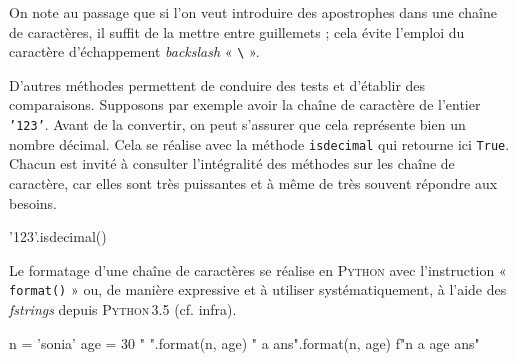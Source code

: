On note au passage que si l'on veut introduire des apostrophes dans une chaîne de caractères, il suffit de la mettre entre guillemets ; cela évite l'emploi du caractère d'échappement \textit{backslash} « \texttt{\textbackslash} ».

D'autres méthodes permettent de conduire des tests et d'établir des comparaisons. Supposons par exemple avoir la chaîne de caractère de l'entier \texttt{'123'}. Avant de la convertir, on peut s'assurer que cela représente bien un nombre décimal. Cela se réalise avec la méthode \texttt{isdecimal} qui retourne ici \texttt{True}. Chacun est invité à consulter l'intégralité des méthodes sur les chaîne de caractère, car elles sont très puissantes et à même de très souvent répondre aux besoins.

\begin{idleconsole}
	\begin{pyconsole}
		'123'.isdecimal()
	\end{pyconsole}
\end{idleconsole}

Le formatage d'une chaîne de caractères se réalise en \textsc{Python} avec l'instruction « \texttt{format()} » ou, de manière expressive et à utiliser systématiquement, à l'aide des \textit{fstrings} depuis \textsc{Python\,3.5} (cf. infra). 

\begin{idleconsole}
	\begin{pyconsole}
		n = 'sonia'
		age = 30
		"{} {}".format(n, age)
		"{} a {} ans".format(n, age)
		f"{n} a {age} ans"
	\end{pyconsole}
\end{idleconsole}

\vspace{.25\baselineskip}


